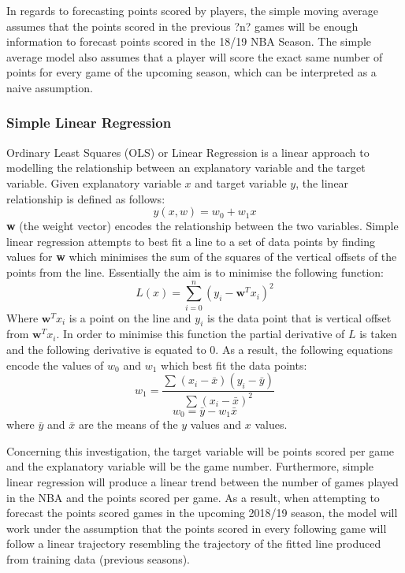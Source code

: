 \documentclass[a4paper,11pt,twoside]{article}
\begin{document}
In regards to forecasting points scored by players, the simple moving average assumes that the points scored in the previous ?n? games will be enough information to forecast points scored in the 18/19 NBA Season. The simple average model also assumes that a player will score the exact same number of points for every game of the upcoming season, which can be interpreted as a naive assumption.


\subsubsection{Simple Linear Regression}
Ordinary Least Squares (OLS) or Linear Regression is a linear approach to modelling the relationship between an explanatory variable and the target variable.  Given explanatory variable \(x\) and target variable \(y\), the linear relationship is defined as follows:
\begin{equation}
y(x,w) = w_{0} + w_{1}x
\end{equation}
\textbf{w} (the weight vector) encodes the relationship between the two variables. Simple linear regression attempts to best fit a line to a set of data points by finding values for \textbf{w} which minimises the sum of the squares of the vertical offsets of the points from the line. Essentially the aim is to minimise the following function:
\begin{equation}
L(x) = \sum_{i=0}^{n}(y_{i}-\textbf{w}^Tx_{i})^2
\end{equation}
Where $\textbf{w}^Tx_{i}$ is a point on the line  and \(y_i\) is the data point that is vertical offset from  $\textbf{w}^Tx_{i}$. In order to minimise this function the partial derivative of $L$ is taken and the following derivative is equated to 0. As a result, the following equations encode the values of \(w_{0}\) and \(w_{1}\) which best fit the data points:
\begin{equation}
w_{1} =\frac{\sum{}^{} (x_{i} - \bar{x})(y_{i} - \bar{y})}{\sum{}^{}(x_{i} - \bar{x})^2}
\end{equation}
\begin{equation}
w_{0} = \bar{y} - w_{1}\bar{x}
\end{equation}
where $\bar{y}$ and $\bar{x}$  are the means of the $y$ values and $x$ values.

Concerning this investigation, the target variable will be points scored per game and the explanatory variable will be the game number. Furthermore, simple linear regression will produce a linear trend between the number of games played in the NBA and the points scored per game. As a result, when attempting to forecast the points scored games in the upcoming 2018/19 season, the model will work under the assumption that the points scored in every following game will follow a linear trajectory resembling the trajectory of the fitted line produced from training data (previous seasons).
\end{document}
